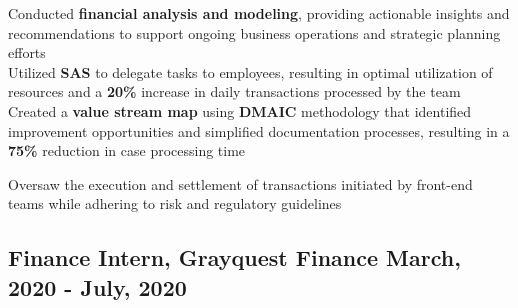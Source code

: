 \documentclass[]{resume}
\begin{document}
\begin{adjustwidth}{0.5cm}{0cm}

    \pt Conducted \textbf{financial analysis and modeling}, providing actionable insights and recommendations to support ongoing business operations and strategic planning efforts \\
    
    
    \pt Utilized \textbf{SAS} to delegate tasks to employees, resulting in optimal utilization of resources and a \textbf{20\%} increase in daily transactions processed by the team \\
    
    \pt Created a \textbf{value stream map} using \textbf{DMAIC} methodology that identified improvement opportunities and simplified documentation processes, resulting in a \textbf{75\%} reduction in case processing time
    
    
    

    \pt Oversaw the execution and settlement of transactions initiated by front-end teams while adhering to risk and regulatory guidelines \\

    
    \sectionsep
\end{adjustwidth}


\subsection{Finance Intern, Grayquest Finance \hfill \normalfont March, 2020 - July, 2020}
\end{document}
